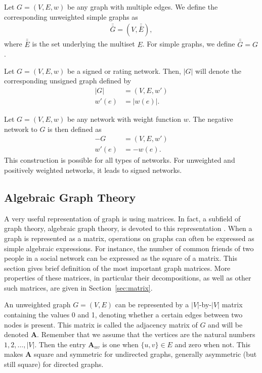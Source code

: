 \documentclass{article}
\begin{document}
Let $G=(V,E,w)$ be any graph with multiple edges.  We define the
corresponding unweighted simple graphs as
\begin{align}
  \bar{\bar{G}} = (V, \bar{\bar E}),
\end{align}
where $\bar{\bar E}$ is the set underlying the multiset $E$. For simple
graphs, we define $\bar{\bar G} = G$. 

Let $G=(V,E,w)$ be a signed or rating network.  Then, $|G|$ will denote
the corresponding unsigned graph defined by
\begin{align}
  |G| &= (V,E, w') \\
  w'(e) &= |w(e)|. \nonumber
\end{align}

Let $G=(V,E,w)$ be any network with weight function $w$.  The negative
network to $G$ is then defined as
\begin{align}
  -G &= (V, E, w') \\
  w'(e) &= -w(e). \nonumber
\end{align}
This construction is possible for all types of networks. For unweighted
and positively weighted networks, it leads to signed networks. 

\subsection{Algebraic Graph Theory}
A very useful representation of graph is using matrices. In fact, a
subfield of graph theory, algebraic graph theory, is devoted to
this representation \citep{b118}.  When a graph is represented as a
matrix, operations on graphs can often be expressed as simple algebraic
expressions.  For instance, the number of common friends of
two people in a social network can be expressed as the square of a
matrix. 
This section gives brief definition of the most important graph
matrices.  More properties of these matrices, in particular their
decompositions, as well as other such 
matrices, are given in Section~\ref{sec:matrix}. 

An unweighted graph $G=(V,E)$ can be represented by a $|V|$-by-$|V|$
matrix containing the values 0 and 1, denoting whether a certain edges
between two nodes is present.  This matrix is called the adjacency
matrix of $G$ and will be denoted $\mathbf A$.  Remember that we assume
that the vertices are the natural numbers $1, 2, \dotsc, |V|$.  Then the
entry $\mathbf A_{uv}$ is one when $\{u,v\} \in E$ and zero when not.
This makes $\mathbf A$ square and symmetric for undirected graphs, generally
asymmetric (but still square) for directed graphs.  
\end{document}
